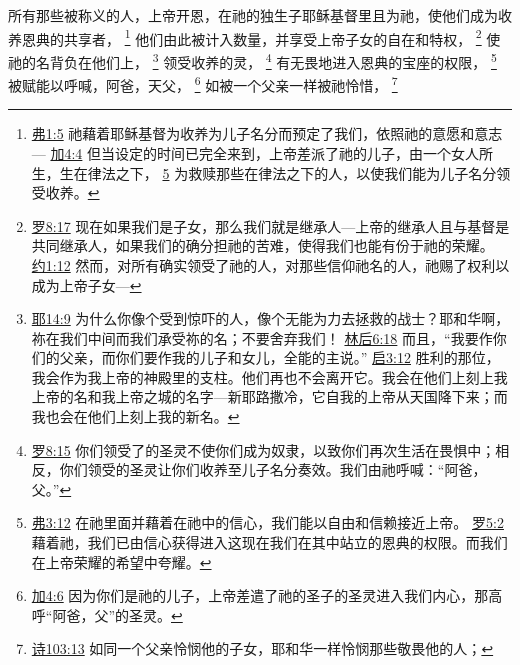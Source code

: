 \documentclass[12pt, a4paper, oneside]{ctexart}
\begin{document}
所有那些被称义的人，上帝开恩，在祂的独生子耶稣基督里且为祂，使他们成为收养恩典的共享者，
	\footnote {
		\href{https://biblehub.com/ephesians/1-5.htm}{弗1:5} 祂藉着耶稣基督为收养为儿子名分而预定了我们，依照祂的意愿和意志---
		\href{https://biblehub.com/galatians/4-4.htm}{加4:4} 但当设定的时间已完全来到，上帝差派了祂的儿子，由一个女人所生，生在律法之下，
		\href{https://biblehub.com/galatians/4-5.htm}{5} 为救赎那些在律法之下的人，以使我们能为儿子名分领受收养。
	}
	他们由此被计入数量，并享受上帝子女的自在和特权，
	\footnote {
		\href{https://biblehub.com/romans/8-17.htm}{罗8:17} 现在如果我们是子女，那么我们就是继承人---上帝的继承人且与基督是共同继承人，如果我们的确分担祂的苦难，使得我们也能有份于祂的荣耀。
		\href{https://biblehub.com/john/1-12.htm}{约1:12} 然而，对所有确实领受了祂的人，对那些信仰祂名的人，祂赐了权利以成为上帝子女---
	}
	使祂的名背负在他们上，
	\footnote {
		\href{https://biblehub.com/jeremiah/14-9.htm}{耶14:9} 为什么你像个受到惊吓的人，像个无能为力去拯救的战士？耶和华啊，祢在我们中间而我们承受祢的名；不要舍弃我们！
		\href{https://biblehub.com/2_corinthians/6-18.htm}{林后6:18} 而且，“我要作你们的父亲，而你们要作我的儿子和女儿，全能的主说。”
		\href{https://biblehub.com/revelation/3-12.htm}{启3:12} 胜利的那位，我会作为我上帝的神殿里的支柱。他们再也不会离开它。我会在他们上刻上我上帝的名和我上帝之城的名字---新耶路撒冷，它自我的上帝从天国降下来；而我也会在他们上刻上我的新名。
	}
	领受收养的灵，
	\footnote {
		\href{https://biblehub.com/romans/8-15.htm}{罗8:15} 你们领受了的圣灵不使你们成为奴隶，以致你们再次生活在畏惧中；相反，你们领受的圣灵让你们收养至儿子名分奏效。我们由祂呼喊：“阿爸，父。”
	}
	有无畏地进入恩典的宝座的权限，
	\footnote {
		\href{https://biblehub.com/ephesians/3-12.htm}{弗3:12} 在祂里面并藉着在祂中的信心，我们能以自由和信赖接近上帝。
		\href{https://biblehub.com/romans/5-2.htm}{罗5:2} 藉着祂，我们已由信心获得进入这现在我们在其中站立的恩典的权限。而我们在上帝荣耀的希望中夸耀。
	}
	被赋能以呼喊，阿爸，天父，
	\footnote {
		\href{https://biblehub.com/galatians/4-6.htm}{加4:6} 因为你们是祂的儿子，上帝差遣了祂的圣子的圣灵进入我们内心，那高呼“阿爸，父”的圣灵。
	}
	如被一个父亲一样被祂怜惜，
	\footnote {
		\href{https://biblehub.com/psalms/103-13.htm}{诗103:13} 如同一个父亲怜悯他的子女，耶和华一样怜悯那些敬畏他的人；
	}
\end{document}
